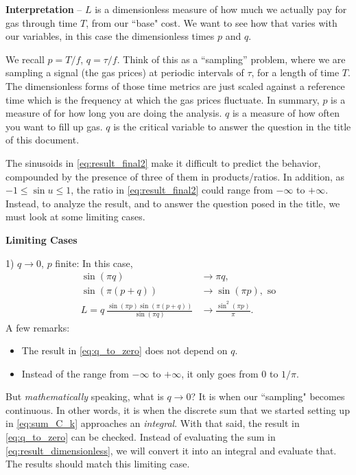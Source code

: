 \documentclass[11pt]{article}
\begin{document}
\par
\textbf{Interpretation} -- $L$ is a dimensionless measure of how much we actually pay for gas through time $T$, from our ``base" cost. We want to see how that varies with our variables, in this case the dimensionless times $p$ and $q$.

\par
We recall $p = T / f$, $q = \tau / f$. Think of this as a ``sampling'' problem, where we are sampling a signal (the gas prices) at periodic intervals of $\tau$, for a length of time $T$. The dimensionless forms of those time metrics are just scaled against a reference time which is the frequency at which the gas prices fluctuate. In summary, $p$ is a measure of for how long you are doing the analysis. $q$ is a measure of how often you want to fill up gas. $q$ is the critical variable to answer the question in the title of this document.

\par
The sinusoids in \eqref{eq:result_final2} make it difficult to predict the behavior, compounded by the presence of three of them in products/ratios. In addition, as $-1 \leq \sin u \leq 1$, the ratio in \eqref{eq:result_final2} could range from $-\infty$ to $+\infty$. Instead, to analyze the result, and to answer the question posed in the title, we must look at some limiting cases.

\par
\textbf{Limiting Cases}

\par
1) $q \rightarrow 0$, $p$ finite: In this case,
\begin{align}
\sin (\pi q) &\rightarrow \pi q, \nonumber\\
\sin (\pi(p+q))  &\rightarrow \sin(\pi p), \text{ so} \nonumber\\[0.5em]
L = q \: \frac{\sin(\pi p) \sin(\pi (p+q))}{\sin(\pi q)} &\rightarrow \frac{\sin^2(\pi p)}{\pi}. \label{eq:q_to_zero}
\end{align}
A few remarks:
\vspace{-2mm}
\begin{itemize}
	\item The result in \eqref{eq:q_to_zero} does not depend on $q$.
	\item Instead of the range from $-\infty$ to $+\infty$, it only goes from 0 to $1/\pi$.
\end{itemize}

But \textit{mathematically} speaking, what is $q \rightarrow 0$? It is when our ``sampling" becomes continuous. In other words, it is when the discrete sum that we started setting up in \eqref{eq:sum_C_k} approaches an \textit{integral}. With that said, the result in \eqref{eq:q_to_zero} can be checked. Instead of evaluating the sum in \eqref{eq:result_dimensionless}, we will convert it into an integral and evaluate that. The results should match this limiting case.


\end{document}

